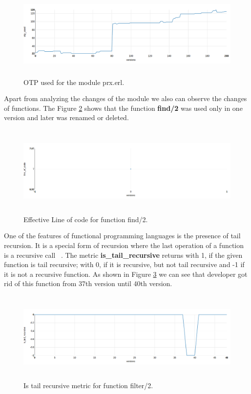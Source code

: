 \begin{figure}[ht]
	\centering
	\includegraphics[height=45mm]{figures/otp_prx.png}
	\caption{OTP used for the module prx.erl.}
	\label{fig:otp_prx}
\end{figure}

Apart from analyzing the changes of the module we also can observe the changes of functions. The Figure \ref{fig:find/2} shows that the function \textbf{find/2} was used only in one version and later was renamed or deleted.

\begin{figure}[ht]
	\centering
	\includegraphics[height=45mm]{figures/find2.png}
	\caption{Effective Line of code for function find/2.}
	\label{fig:find/2}
\end{figure}

One of the features of functional programming languages is the presence of tail recursion. It is a special form of recursion where the last operation of a function is a recursive call ~\cite{tail}.
The metric \textbf{is\_tail\_recursive} returns with 1, if the given function is tail recursive; with 0, if it is recursive, but not tail recursive and -1 if it is not a recursive function. As shown in Figure \ref{fig:tail1} we can see that developer got rid of this function from 37th version until 40th version.

\begin{figure}[ht]
	\centering
	\includegraphics[height=45mm]{figures/filter2.png}
	\caption{Is tail recursive metric for function filter/2.}
	\label{fig:tail1}
\end{figure}

